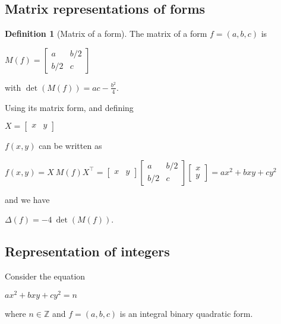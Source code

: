\documentclass{article}
\theoremstyle{definition}
\newtheorem{definition}{Definition}[section]
\theoremstyle{theorem}
\theoremstyle{example}
\theoremstyle{corollary}
\begin{document}
\bigskip

\subsection{Matrix representations of forms}

\bigskip

\theoremstyle{definition}
\begin{definition}[Matrix of a form]
The matrix of a form \(f = (a, b, c)\) is
\begin{center}
\(M(f) = \begin{bmatrix} a & b/2 \\ b/2 & c \end{bmatrix}\)
\end{center}
with \(\det(M(f)) = ac - \frac{b^{2}}{4}\).
\end{definition}

\bigskip

Using its matrix form, and defining
\begin{center}
\(X = \begin{bmatrix} x & y \end{bmatrix}\)
\end{center}
\(f(x, y)\) can be written as
\begin{center}
\(f(x, y) = X \ M(f) X^{\top} = \begin{bmatrix} x & y \end{bmatrix} \begin{bmatrix} a & b/2 \\ b/2 & c \end{bmatrix} \begin{bmatrix} x \\ y \end{bmatrix} = a x^{2} + b xy + c y^{2}\)
\end{center}

and we have

\begin{center}
\(\Delta(f) = -4 \ \det(M(f))\).
\end{center}

\bigskip




\subsection{Representation of integers}

\bigskip

Consider the equation
\begin{center}
\(a x^{2} + b x y + c y^{2} = n\)
\end{center}
where \(n \in \mathbb{Z}\) and \(f = (a, b, c)\) is an integral binary quadratic form.
\end{document}
